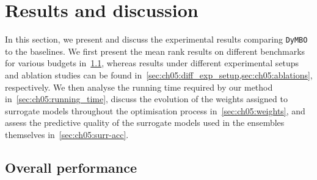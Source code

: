 



\section{Results and discussion}
\label{sec:ch05:res}

In this section, we present and discuss the experimental results comparing \texttt{DyMBO} to the baselines. 
We first present the mean rank results on different benchmarks for various budgets in~\cref{sec:ch05:res_general}, whereas results under different experimental setups and ablation studies can be found in~\cref{sec:ch05:diff_exp_setup,sec:ch05:ablations}, respectively. We then analyse the running time required by our method in~\cref{sec:ch05:running_time}, discuss the evolution of the weights assigned to surrogate models throughout the optimisation process in~\cref{sec:ch05:weights}, and assess the predictive quality of the surrogate models used in the ensembles themselves in~\cref{sec:ch05:surr-acc}.

\subsection{Overall performance}
\label{sec:ch05:res_general}

